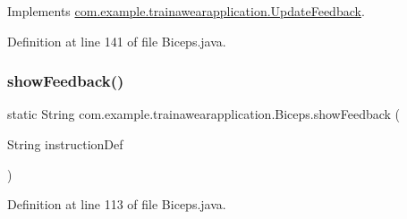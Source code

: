 Implements \mbox{\hyperlink{interfacecom_1_1example_1_1trainawearapplication_1_1_update_feedback_a7a026880188b11aca6d8184d57e699e8}{com.\+example.\+trainawearapplication.\+Update\+Feedback}}.



Definition at line 141 of file Biceps.\+java.


\begin{DoxyCode}{0}

\end{DoxyCode}
\mbox{\label{classcom_1_1example_1_1trainawearapplication_1_1_biceps_ad9e0fdf8309b31736b338a3b29079b24}} 
\subsubsection{\texorpdfstring{showFeedback()}{showFeedback()}}
{\footnotesize\ttfamily static String com.\+example.\+trainawearapplication.\+Biceps.\+show\+Feedback (\begin{DoxyParamCaption}\item[{String}]{instruction\+Def }\end{DoxyParamCaption})\hspace{0.3cm}{\ttfamily [static]}}



Definition at line 113 of file Biceps.\+java.



